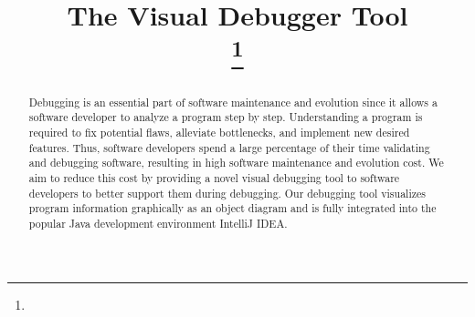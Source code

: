 \documentclass[conference]{IEEEtran}
\newcommand{\intellij}{IntelliJ IDEA}
\begin{document}
\title{The Visual Debugger Tool\\
{}
\thanks{}
}

\author{
}

\maketitle

\begin{abstract}
Debugging is an essential part of software maintenance and evolution since it allows a software developer to analyze a program step by step.
Understanding a program is required to fix potential flaws, alleviate bottlenecks, and implement new desired features.
Thus, software developers spend a large percentage of their time validating and debugging software, resulting in high software maintenance and evolution cost.
We aim to reduce this cost by providing a novel visual debugging tool to software developers to better support them during debugging.
Our debugging tool visualizes program information graphically as an object diagram and is fully integrated into the popular Java development environment \intellij{}.
\end{abstract}
\end{document}
